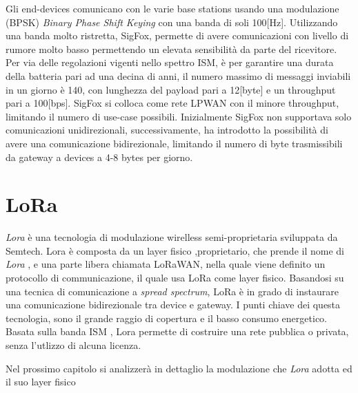 Gli end-devices comunicano con le varie base stations usando una modulazione (BPSK)
\emph{Binary Phase Shift Keying} con una banda di soli 100[Hz]. Utilizzando una
banda molto ristretta, SigFox, permette di avere comunicazioni con livello di
rumore molto basso permettendo un elevata sensibilità da parte del
ricevitore. 
Per via delle regolazioni vigenti nello spettro ISM, è per garantire una durata
della batteria pari ad una decina di anni, il numero massimo di messaggi
inviabili in un giorno è 140, con lunghezza del payload pari a 12[byte] e un
throughput pari a 100[bps]. SigFox si colloca come rete LPWAN con il minore
throughput, limitando il numero di use-case possibili. Inizialmente SigFox non
supportava solo comunicazioni unidirezionali, successivamente, ha introdotto la
possibilità di avere una comunicazione bidirezionale, limitando il numero di
byte trasmissibili da gateway a devices a 4-8 bytes per giorno.

\section{LoRa}
\emph{Lora} è una tecnologia di modulazione wirelless semi-proprietaria 
sviluppata da Semtech. Lora è composta da un layer fisico ,proprietario, che
prende il nome di \emph{Lora}\cite{LoRaCss101} , e una parte libera chiamata 
LoRaWAN\cite{LoRaWAN101}, nella quale viene definito un protocollo di communicazione, 
il quale usa LoRa come layer fisico. 
Basandosi su una tecnica di comunicazione a \emph{spread spectrum}, LoRa è in
grado di instaurare una comunicazione bidirezionale tra device e gateway.
I punti chiave dei questa tecnologia, sono il grande raggio di copertura e il 
basso consumo energetico. 
Basata sulla banda ISM , Lora permette di costruire una rete pubblica o privata,
senza l'utlizzo di alcuna licenza.

Nel prossimo capitolo si analizzerà in dettaglio la modulazione che \emph{Lora}
adotta ed il suo layer fisico
